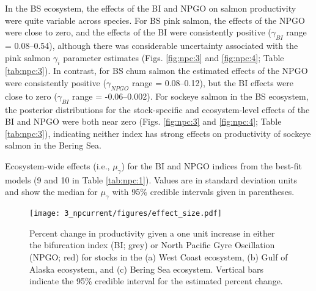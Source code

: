 In the BS ecosystem, the effects of the BI and NPGO on salmon productivity were
quite variable across species. For BS pink salmon, the effects of the NPGO were
close to zero, and the effects of the BI were consistently positive
(\(\gamma_{BI}\) range = 0.08--0.54), although there was considerable
uncertainty associated with the pink salmon \(\gamma_i\) parameter estimates
(Figs. \ref{fig:npc:3} and \ref{fig:npc:4}; Table \ref{tab:npc:3}). In contrast,
for BS chum salmon the estimated effects of the NPGO were consistently positive
(\(\gamma_{NPGO}\) range = 0.08--0.12), but the BI effects were close to zero
(\(\gamma_{BI}\) range = -0.06--0.002). For sockeye salmon in the BS ecosystem,
the posterior distributions for the stock-specific and ecosystem-level effects
of the BI and NPGO were both near zero (Figs. \ref{fig:npc:3} and
\ref{fig:npc:4}; Table \ref{tab:npc:3}), indicating neither index has strong
effects on productivity of sockeye salmon in the Bering Sea.

\begin{table}[htbp]
  \small \centering \libertineLF
  \caption[Ecosystem-wide effects for the BI and NPGO indices from the
           best-fit models]{Ecosystem-wide effects (i.e., $\mu_{\gamma}$) for
           the BI and NPGO indices from the best-fit models (9 and 10 in Table
           \ref{tab:npc:1}). Values are in standard deviation units and show the
           median for $\mu_{\gamma}$ with 95\% credible intervals given in
           parentheses.}
  
  \label{tab:npc:3}
\end{table}

\begin{figure}[htbp]
  \centering \texttt{[image: 3\_npcurrent/figures/effect\_size.pdf]}
  \caption[Percent change in productivity given a one unit increase in either
           the bifurcation index or North Pacific Gyre Oscillation]{Percent
           change in productivity given a one unit increase in either the
           bifurcation index (BI; grey) or North Pacific Gyre Oscillation (NPGO;
           red) for stocks in the (a) West Coast ecosystem, (b) Gulf of Alaska
           ecosystem, and (c) Bering Sea ecosystem. Vertical bars indicate the
           95\% credible interval for the estimated percent change.}
    \label{fig:npc:5}
\end{figure}

